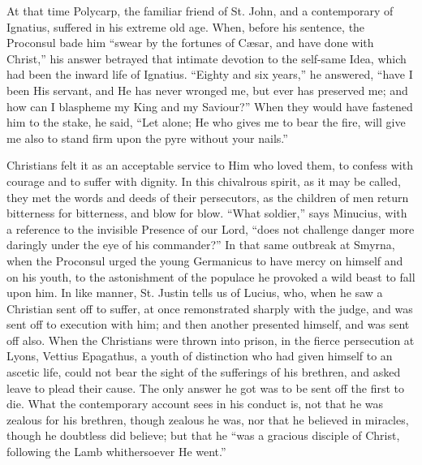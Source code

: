 At that time Polycarp, the familiar friend of St. John, and a
contemporary of Ignatius, suffered in his extreme old age. When,
before his sentence, the Proconsul bade him ``swear by the
fortunes of Cæsar, and have done with Christ,'' his answer
betrayed that intimate devotion to the self-same Idea, which had been
the inward life of Ignatius. ``Eighty and six years,'' he
answered, ``have I been His servant, and He has never wronged me,
but ever has preserved me; and how can I blaspheme my King and my
Saviour?'' When they would have fastened him to the stake, he
said, ``Let alone; He who gives me to bear the fire, will give me
also to stand firm upon the pyre without your nails.''

Christians felt it as an acceptable service to Him who loved them,
to confess with courage and to suffer with dignity. In this
chivalrous spirit, as it may be called, they met the words and deeds
of their persecutors, as the children of men return bitterness for
bitterness, and blow for blow. ``What soldier,'' says Minucius,
with a reference to the invisible Presence of our Lord, ``does not
challenge danger more daringly under the eye of his commander?''
In that same outbreak at Smyrna, when the Proconsul urged the young
Germanicus to have mercy on himself and on his youth, to the
astonishment of the populace he provoked a wild beast to fall upon
him. In like manner, St. Justin tells us of Lucius, who, when he saw a
Christian sent off to suffer, at once remonstrated sharply with the
judge, and was sent off to execution with him; and then another
presented himself, and was sent off also. When the Christians were
thrown into prison, in the fierce persecution at Lyons, Vettius
Epagathus, a youth of distinction who had given himself to an ascetic
life, could not bear the sight of the sufferings of his brethren, and
asked leave to plead their cause. The only answer he got was to be
sent off the first to die. What the contemporary account sees in his
conduct is, not that he was zealous for his brethren, though zealous
he was, nor that he believed in miracles, though he doubtless did
believe; but that he ``was a gracious disciple of Christ,
following the Lamb whithersoever He went.''

